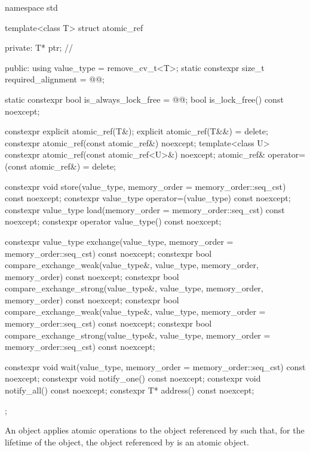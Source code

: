 %
%
\begin{codeblock}
namespace std {
  template<class T> struct atomic_ref {
  private:
    T* ptr;             // \expos

  public:
    using value_type = remove_cv_t<T>;
    static constexpr size_t required_alignment = @@;

    static constexpr bool is_always_lock_free = @@;
    bool is_lock_free() const noexcept;

    constexpr explicit atomic_ref(T&);
    explicit atomic_ref(T&&) = delete;
    constexpr atomic_ref(const atomic_ref&) noexcept;
    template<class U>
      constexpr atomic_ref(const atomic_ref<U>&) noexcept;
    atomic_ref& operator=(const atomic_ref&) = delete;

    constexpr void store(value_type, memory_order = memory_order::seq_cst) const noexcept;
    constexpr value_type operator=(value_type) const noexcept;
    constexpr value_type load(memory_order = memory_order::seq_cst) const noexcept;
    constexpr operator value_type() const noexcept;

    constexpr value_type exchange(value_type,
                                  memory_order = memory_order::seq_cst) const noexcept;
    constexpr bool compare_exchange_weak(value_type&, value_type,
                                         memory_order, memory_order) const noexcept;
    constexpr bool compare_exchange_strong(value_type&, value_type,
                                           memory_order, memory_order) const noexcept;
    constexpr bool compare_exchange_weak(value_type&, value_type,
                                         memory_order = memory_order::seq_cst) const noexcept;
    constexpr bool compare_exchange_strong(value_type&, value_type,
                                           memory_order = memory_order::seq_cst) const noexcept;

    constexpr void wait(value_type, memory_order = memory_order::seq_cst) const noexcept;
    constexpr void notify_one() const noexcept;
    constexpr void notify_all() const noexcept;
    constexpr T* address() const noexcept;
  };
}
\end{codeblock}

\pnum
An  object applies atomic operations to
the object referenced by  such that,
for the lifetime of the  object,
the object referenced by  is an atomic object.

